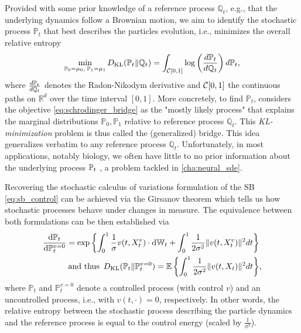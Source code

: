 Provided with some prior knowledge of a reference process $\mathbb{Q}_t$, e.g., that the underlying dynamics follow a Brownian motion, we aim to identify the stochastic process $\mathbb{P}_t$ that best describes the particles evolution, i.e., minimizes the overall relative entropy
\begin{equation}
	\label{eq:schrodinger_bridge}
	\min_{ \substack{ \mathbb{P}_{{0}} = \mu_0, \; \mathbb{P}_{{1}} = \mu_1} } D_{\mathrm{KL}}(\mathbb{P}_{{t}} \| \mathbb{Q}_{ t }) = \int_{{\mathcal{C}}[0,1]} \log \left( \frac{d\mathbb{P}_{{t}}}{d \mathbb{Q}_{ t }} \right) d\mathbb{P}_{{t}},
\end{equation}
where $\frac{d\mathbb{P}_{{t}}}{d\mathbb{Q}_{ t }}$ denotes the Radon-Nikodym derivative and ${\mathcal{C}}[0,1]$ the continuous paths on $\mathbb{R}^d$ over the time interval $[0, 1]$.
More concretely, to find $\mathbb{P}_t$, \citet{schrodinger1931umkehrung, schrodinger1932theorie} considers the objective \eqref{eq:schrodinger_bridge} as the "mostly likely process" that explains the marginal distributions $\mathbb{P}_0, \mathbb{P}_1$ relative to reference process $\mathbb{Q}_t$.
This \emph{KL-minimization} problem is thus called the (generalized) \citeauthor{schrodinger1931umkehrung} bridge.
This idea generalizes verbatim to any reference process $\mathbb{Q}_t$. Unfortunately, in most applications, notably biology, we often have little to no prior information about the underlying process $\mathbb{P}_{{t}}$ \citep{liberali2014hierarchical}, a problem tackled in \cref{cha:neural_sde}.

Recovering the stochastic calculus of variations formulation of the \acrlong{SB} \eqref{eq:sb_control} can be achieved via the Girsanov theorem which tells us how stochastic processes behave under changes in measure. The equivalence between both formulations can be then established via
\begin{align*}
	\frac{\mathrm{d}\mathbb{P}_{t}}{\mathrm{d} \mathbb{P}^{v=0}_t} = \exp \left\{ \int_0^1 \frac{1}{\sigma} v(t, X_t^v) \cdot \mathrm{d} \mathbb{W}_t +  \int_0^1 \frac{1}{2\sigma^2} \lVert v(t, X_t^v)\rVert^2 dt \right\}& \\
	\text{and thus} \enspace D_{\mathrm{KL}}(\mathbb{P}_{t} \| \mathbb{P}^{v=0}_t) = \mathbb{E} \left\{ \int_0^1 \frac{1}{2\sigma^2}\lVert v(t, X_t)\rVert^2 dt \right\}& ,
\end{align*}
where $\mathbb{P}_t$ and $\mathbb{P}^{v=0}_t$ denote a controlled process (with control $v$) and an uncontrolled process, i.e., with $v(t, \cdot)=0$, respectively.
In other words, the relative entropy between the stochastic process describing the particle dynamics and the reference process is equal to the control energy (scaled by $\frac{1}{\sigma^2}$).

